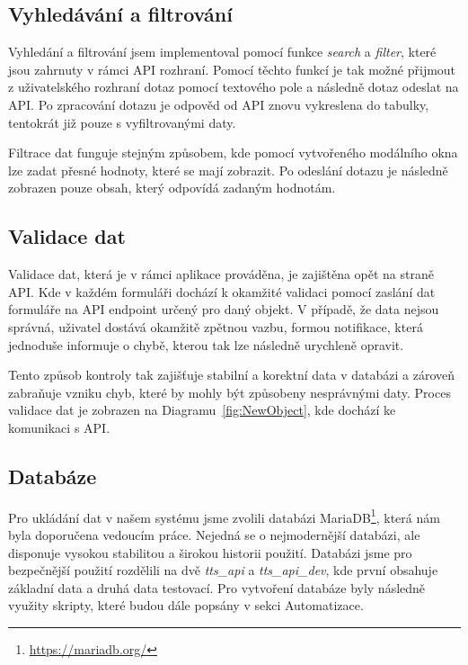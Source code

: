 

\subsection{Vyhledávání a filtrování}
\label{subsec:implementation-technologies-search}
Vyhledání a filtrování jsem implementoval pomocí funkce \textit{search} a \textit{filter}, které jsou zahrnuty v rámci API rozhraní. Pomocí těchto funkcí je tak možné přijmout z uživatelského rozhraní dotaz pomocí textového pole a následně dotaz odeslat na API. Po zpracování dotazu je odpověd od API znovu vykreslena do tabulky, tentokrát již pouze s vyfiltrovanými daty.

Filtrace dat funguje stejným způsobem, kde pomocí vytvořeného modálního okna lze zadat přesné hodnoty, které se mají zobrazit. Po odeslání dotazu je následně zobrazen pouze obsah, který odpovídá zadaným hodnotám.

\subsection{Validace dat}
\label{subsec:implementation-technologies-validation}
Validace dat, která je v rámci aplikace prováděna, je zajištěna opět na straně API. Kde v každém formuláři dochází k okamžité validaci pomocí zaslání dat formuláře na API endpoint určený pro daný objekt. V případě, že data nejsou správná, uživatel dostává okamžitě zpětnou vazbu, formou notifikace, která jednoduše informuje o chybě, kterou tak lze následně urychleně opravit.

Tento způsob kontroly tak zajišťuje stabilní a korektní data v databázi a zároveň zabraňuje vzniku chyb, které by mohly být způsobeny nesprávnými daty. Proces validace dat je zobrazen na Diagramu~\ref{fig:NewObject}, kde dochází ke komunikaci s API\@.

\subsection{Databáze}
\label{subsec:implementation-technologies-database}
Pro ukládání dat v našem systému jsme zvolili databázi MariaDB\footnote{\href{https://mariadb.org/}{https://mariadb.org/}}, která nám byla doporučena vedoucím práce. Nejedná se o nejmodernější databázi, ale disponuje vysokou stabilitou a širokou historii použití. Databázi jsme pro bezpečnější použití rozdělili na dvě \textit{tts\_api} a \textit{tts\_api\_dev}, kde první obsahuje základní data a druhá data testovací. Pro vytvoření databáze byly následně využity skripty, které budou dále popsány v sekci Automatizace.

